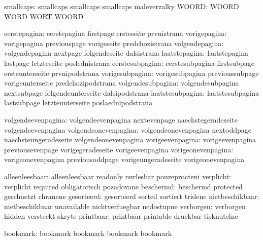           smallcaps:  smallcaps            smallcaps           smallcaps
                      maleverzalky
              WOORD:  WOORD                WORD                WORT
                      WOORD %

       eerstepagina:  eerstepagina         firstpage           ersteseite
                      prvnistrana
       vorigepagina:  vorigepagina         previouspage        vorigeseite
                      predchozistrana
     volgendepagina:  volgendepagina       nextpage            folgendeseite
                      dalsistrana
      laatstepagina:  laatstepagina        lastpage            letzteseite
                      poslednistrana
    eerstesubpagina:  eerstesubpagina      firstsubpage        ersteunterseite
                      prvnipodstrana
    vorigesubpagina:  vorigesubpagina      previoussubpage     vorigeunterseite
                      predchozipodstrana
  volgendesubpagina:  volgendesubpagina    nextsubpage         folgendeunterseite
                      dalsipodstrana
   laatstesubpagina:  laatstesubpagina     lastsubpage         letzteunterseite
                      poslaednipodstrana

  volgendeevenpagina: volgendeevenpagina   nextevenpage        naechstegeradeseite
                      volgendeevenpagina %
volgendeonevenpagina: volgendeonevenpagina nextoddpage         naechsteungeradeseite
                      volgendeonevenpagina %
    vorigeevenpagina: vorigeevenpagina     previousevenpage    vorigegeradeseite
                      vorigeevenpagina %
  vorigeonevenpagina: vorigeonevenpagina   previousoddpage     vorigeungeradeseite
                      vorigeonevenpagina %

     alleenleesbaar:  alleenleesbaar       readonly            nurlesbar
                      pouzeprocteni
          verplicht:  verplicht            required            obligatorisch
                      pozadovane
          beschermd:  beschermd            protected           geschuetzt
                      chranene
         gesorteerd:  gesorteerd           sorted              sortiert
                      tridene
    nietbeschikbaar:  nietbeschikbaar      unavailable         nichtverfuegbar
                      nedostupne
          verborgen:  verborgen            hidden              versteckt
                      skryte
          printbaar:  printbaar            printable           druckbar
                      tisknutelne

           bookmark:  bookmark             bookmark            bookmark
                      bookmark 

